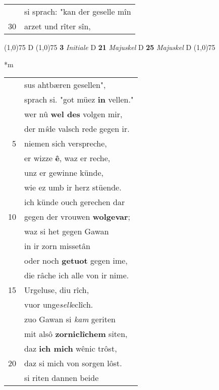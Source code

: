 \documentclass[8pt,a4paper,notitlepage]{article}
\begin{document}
\begin{table}[ht]
\begin{minipage}[t]{0.5\linewidth}
\begin{tabular}{rl}
 & si sprach: "kan der geselle mîn\\ 
30 & arzet und rîter sîn,\\ 
\end{tabular}
\scriptsize
\line(1,0){75} \newline
D \newline
\line(1,0){75} \newline
\textbf{3} \textit{Initiale} D  \textbf{21} \textit{Majuskel} D  \textbf{25} \textit{Majuskel} D  \newline
\line(1,0){75} \newline
\newline
\end{minipage}
\hspace{0.5cm}
\begin{minipage}[t]{0.5\linewidth}
\small
\begin{center}*m
\end{center}
\begin{tabular}{rl}
 & sus ahtbæren gesellen",\\ 
 & sprach si. "got müez \textbf{in} vellen."\\ 
 & wer nû \textbf{wel des} volgen mir,\\ 
 & der m\textit{î}de valsch rede gegen ir.\\ 
5 & niemen sich verspreche,\\ 
 & er wizze \textbf{ê}, waz er reche,\\ 
 & unz er gewinne künde,\\ 
 & wie ez umb ir herz stüende.\\ 
 & ich künde ouch gerechen dar\\ 
10 & gegen der vrouwen \textbf{wolgevar};\\ 
 & waz si het gegen Gawan\\ 
 & in ir zorn missetân\\ 
 & oder noch \textbf{getuot} gegen ime,\\ 
 & die râche ich alle von ir nime.\\ 
15 & Urgeluse, diu rîch,\\ 
 & vuor unge\textit{sell}eclîch.\\ 
 & zuo Gawan si \textit{kam} geriten\\ 
 & mit alsô \textbf{zorniclîchem} siten,\\ 
 & daz \textbf{ich mich} wênic trôst,\\ 
20 & daz si mich von sorgen lôst.\\ 
 & si riten dannen beide\\ 

\end{tabular}
\end{minipage}
\end{table}
\end{document}
